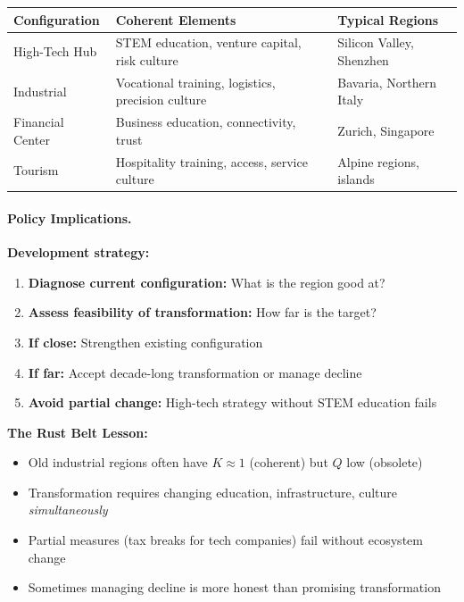 \documentclass[12pt,a4paper]{article}
\begin{document}
\begin{center}
\renewcommand{\arraystretch}{1.2}
\begin{tabular}{lll}
\hline
\textbf{Configuration} & \textbf{Coherent Elements} & \textbf{Typical Regions} \\
\hline
High-Tech Hub & STEM education, venture capital, risk culture & Silicon Valley, Shenzhen \\
Industrial & Vocational training, logistics, precision culture & Bavaria, Northern Italy \\
Financial Center & Business education, connectivity, trust & Zurich, Singapore \\
Tourism & Hospitality training, access, service culture & Alpine regions, islands \\
\hline
\end{tabular}
\end{center}

\paragraph{Policy Implications.}
\textbf{Development strategy:}
\begin{enumerate}
  \item \textbf{Diagnose current configuration:} What is the region good at?
  \item \textbf{Assess feasibility of transformation:} How far is the target?
  \item \textbf{If close:} Strengthen existing configuration
  \item \textbf{If far:} Accept decade-long transformation or manage decline
  \item \textbf{Avoid partial change:} High-tech strategy without STEM education fails
\end{enumerate}

\textbf{The Rust Belt Lesson:}
\begin{itemize}
  \item Old industrial regions often have $K \approx 1$ (coherent) but $Q$ low (obsolete)
  \item Transformation requires changing education, infrastructure, culture \emph{simultaneously}
  \item Partial measures (tax breaks for tech companies) fail without ecosystem change
  \item Sometimes managing decline is more honest than promising transformation
\end{itemize}
\end{document}
